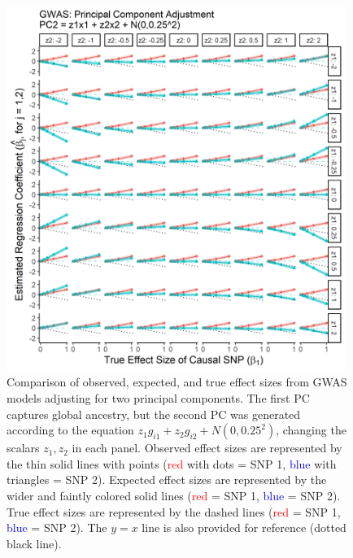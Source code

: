 \documentclass[12pt]{article}
\begin{document}
\begin{figure}[!htb]
\centering
\includegraphics[width=0.98\textwidth]{figs/finalfigs/figS10_sims_pcs_gwas}
\caption[Observed versus expected and true effect sizes from principal component adjusted GWAS models.]%
{Comparison of observed, expected, and true effect sizes from GWAS models adjusting for two principal components. 
The first PC captures global ancestry, but the second PC was generated according to the equation $z_1 g_{i1} + z_2 g_{i2} + N(0, 0.25^2)$, changing the scalars $z_1,z_2$ in each panel.
Observed effect sizes  are represented by the thin solid lines with points (\textcolor{red}{red} with dots = SNP 1, \textcolor{blue}{blue} with triangles = SNP 2). 
Expected effect sizes  are represented by the wider and faintly colored solid lines (\textcolor{red}{red} = SNP 1, \textcolor{blue}{blue} = SNP 2).
True effect sizes are represented by the dashed lines (\textcolor{red}{red} = SNP 1, \textcolor{blue}{blue} = SNP 2).
The $y = x$ line is also provided for reference (dotted black line).}
\label{fig:pcs_gwas}
\end{figure}
\end{document}
